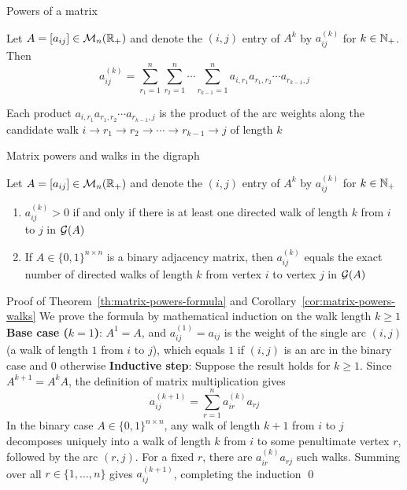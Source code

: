 \documentclass[aspectratio=169]{beamer}\usepackage[]{graphicx}\usepackage[]{xcolor}
\begin{document}
\begin{frame}{Powers of a matrix}
\begin{theorem}
\label{th:matrix-powers-formula}
Let $A = [a_{ij}] \in \mathcal{M}_n(\mathbb{R}_+)$ and denote the $(i, j)$ entry of $A^k$ by $a_{ij}^{(k)}$ for $k \in \mathbb{N}_+$. Then
\[
a_{ij}^{(k)} = \sum_{r_1=1}^n \sum_{r_2=1}^n \cdots \sum_{r_{k-1}=1}^n a_{i, r_1} a_{r_1, r_2} \cdots a_{r_{k-1}, j}
\]
\end{theorem}
\vfill
Each product $a_{i, r_1} a_{r_1, r_2} \cdots a_{r_{k-1}, j}$ is the product of the arc weights along the candidate walk $i \to r_1 \to r_2 \to \cdots \to r_{k-1} \to j$ of length $k$
\end{frame}

\begin{frame}{Matrix powers and walks in the digraph}
\begin{importantcorollary}
\label{cor:matrix-powers-walks}
Let $A = [a_{ij}] \in \mathcal{M}_n(\mathbb{R}_+)$ and denote the $(i, j)$ entry of $A^k$ by $a_{ij}^{(k)}$ for $k \in \mathbb{N}_+$
\begin{enumerate}
\item $a_{ij}^{(k)} > 0$ if and only if there is at least one directed walk of length $k$ from $i$ to $j$ in $\mathcal{G}(A)$
\item If $A \in \{0, 1\}^{n \times n}$ is a binary adjacency matrix, then $a_{ij}^{(k)}$ equals the exact number of directed walks of length $k$ from vertex $i$ to vertex $j$ in $\mathcal{G}(A)$
\end{enumerate}
\end{importantcorollary}
\end{frame}

\begin{frame}{Proof of Theorem~\ref{th:matrix-powers-formula} and Corollary~\ref{cor:matrix-powers-walks}}
We prove the formula by mathematical induction on the walk length $k \ge 1$
\vfill
\textbf{Base case ($k = 1$)}: $A^1 = A$, and $a_{ij}^{(1)} = a_{ij}$ is the weight of the single arc $(i, j)$ (a walk of length $1$ from $i$ to $j$), which equals $1$ if $(i, j)$ is an arc in the binary case and $0$ otherwise
\vfill
\textbf{Inductive step}: Suppose the result holds for $k \ge 1$. Since $A^{k+1} = A^k A$, the definition of matrix multiplication gives
\[
a_{ij}^{(k+1)} = \sum_{r=1}^n a_{ir}^{(k)} a_{rj}
\]
In the binary case $A \in \{0, 1\}^{n \times n}$, any walk of length $k+1$ from $i$ to $j$ decomposes uniquely into a walk of length $k$ from $i$ to some penultimate vertex $r$, followed by the arc $(r, j)$. For a fixed $r$, there are $a_{ir}^{(k)} a_{rj}$ such walks. Summing over all $r \in \{1, \ldots, n\}$ gives $a_{ij}^{(k+1)}$, completing the induction \qed
\end{frame}
\end{document}
